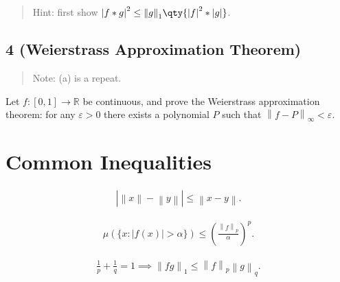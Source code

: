 \begin{quote}
Hint: first show
\({\left\lvert {f\ast g} \right\rvert}^2 \leq {\left\lVert {g} \right\rVert}_1 \qty{ {\left\lvert {f} \right\rvert}^2 \ast {\left\lvert {g} \right\rvert}}\).
\end{quote}

\hypertarget{weierstrass-approximation-theorem}{%
\subsection{4 (Weierstrass Approximation
Theorem)}\label{weierstrass-approximation-theorem}}

\begin{quote}
Note: (a) is a repeat.
\end{quote}

Let \(f: [0, 1]\to {\mathbb{R}}\) be continuous, and prove the
Weierstrass approximation theorem: for any \(\varepsilon> 0\) there
exists a polynomial \(P\) such that
\({\left\lVert {f - P} \right\rVert}_{\infty} < \varepsilon\).

\hypertarget{common-inequalities}{%
\section{Common Inequalities}\label{common-inequalities}}

\begin{proposition}

\begin{align*}  
{\left\lvert {{\left\lVert {x} \right\rVert} - {\left\lVert {y} \right\rVert}} \right\rvert} \leq {\left\lVert {x - y} \right\rVert}
.\end{align*}

\end{proposition}

\begin{proposition}

\begin{align*}  
\mu(\{x:|f(x)|>\alpha\}) \leq\left(\frac{{\left\lVert {f} \right\rVert}_{p}}{\alpha}\right)^{p}
.\end{align*}

\end{proposition}

\begin{proposition}

\begin{align*}  
\frac 1 p + \frac 1 q = 1 \implies {\left\lVert {f g} \right\rVert}_{1} \leq {\left\lVert {f} \right\rVert}_{p} {\left\lVert {g} \right\rVert}_{q}
.\end{align*}

\end{proposition}

